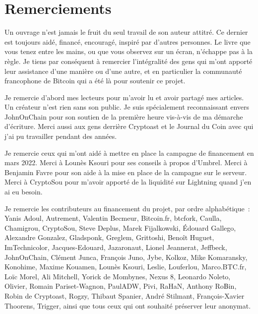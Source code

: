 
\chapter*{Remerciements}

Un ouvrage n'est jamais le fruit du seul travail de son auteur attitré. Ce dernier est toujours aidé, financé, encouragé, inspiré par d'autres personnes. Le livre que vous tenez entre les mains, ou que vous observez sur un écran, n'échappe pas à la règle. Je tiens par conséquent à remercier l'intégralité des gens qui m'ont apporté leur assistance d'une manière ou d'une autre, et en particulier la communauté francophone de Bitcoin qui a été là pour soutenir ce projet.

Je remercie d'abord mes lecteurs pour m'avoir lu et avoir partagé mes articles. Un créateur n'est rien sans son public. Je suis spécialement reconnaissant envers JohnOnChain pour son soutien de la première heure vis-à-vis de ma démarche d'écriture. Merci aussi aux gens derrière Cryptoast et le Journal du Coin avec qui j'ai pu travailler pendant des années.

Je remercie ceux qui m'ont aidé à mettre en place la campagne de financement en mars 2022. Merci à Lounès Ksouri pour ses conseils à propos d'Umbrel. Merci à Benjamin Favre pour son aide à la mise en place de la campagne sur le serveur. Merci à CryptoSou pour m'avoir apporté de la liquidité sur Lightning quand j'en ai eu besoin.

Je remercie les contributeurs au financement du projet, par ordre alphabétique~: Yanis Adoul, Autrement, Valentin Becmeur, Bitcoin.fr, btcfork, Caulla, Chamigrou, CryptoSou, Steve Deplus, Marek Fijalkowski, Édouard Gallego, Alexandre Gonzalez, Gladsponk, Greglem, Grittoshi, Benoît Huguet, ImTechnicolor, Jacques-Edouard, Jazaronaut, Lionel Jeannerat, Jeffbeck, JohnOnChain, Clément Junca, François Juno, Jybe, Kolkoz, Mike Komaransky, Konohime, Maxime Kouamen, Lounès Ksouri, Leslie, Louferlou, Marco.BTC.fr, Loïc Morel, Ali Mitchell, Yorick de Mombynes, Nexus 8, Leonardo Noleto, Olivier, Romain Pariset-Wagnon, PaulADW, Pivi, RaHaN, Anthony Ro฿in, Robin de Cryptoast, Rogzy, Thibaut Spanier, André Stilmant, François-Xavier Thoorens, Trigger, ainsi que tous ceux qui ont souhaité préserver leur anonymat.

